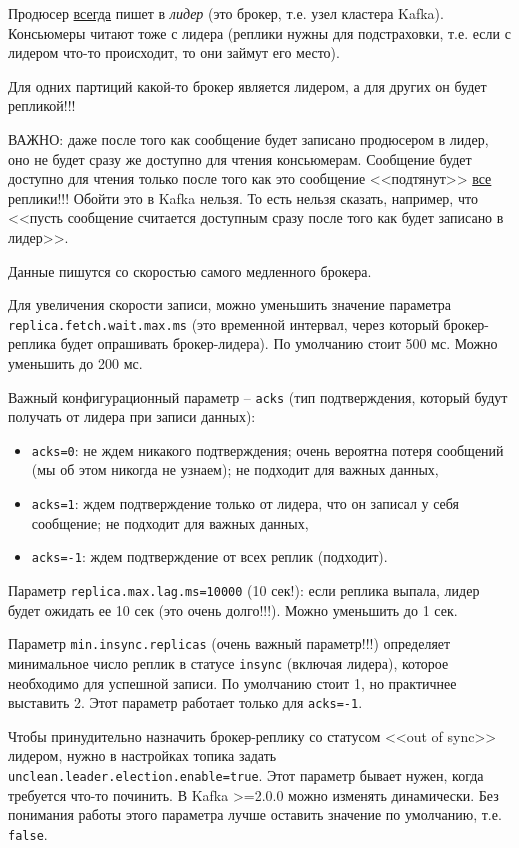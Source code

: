 \documentclass[%
	11pt,
	a4paper,
	utf8,
		]{article}
\begin{document}
Продюсер \underline{всегда} пишет в \emph{лидер} (это брокер, т.е. узел кластера Kafka). Консьюмеры читают тоже с лидера (реплики нужны для подстраховки, т.е. если с лидером что-то происходит, то они займут его место).

Для одних партиций какой-то брокер является лидером, а для других он будет репликой!!!

ВАЖНО: даже после того как сообщение будет записано продюсером в лидер, оно не будет сразу же доступно для чтения консьюмерам. Сообщение будет доступно для чтения только после того как это сообщение <<подтянут>> \underline{все} реплики!!! Обойти это в Kafka нельзя. То есть нельзя сказать, например, что <<пусть сообщение считается доступным сразу после того как будет записано в лидер>>.

Данные пишутся со скоростью самого медленного брокера.

Для увеличения скорости записи, можно уменьшить значение параметра \texttt{replica.fetch.wait.max.ms} (это временной интервал, через который брокер-реплика будет опрашивать брокер-лидера). По умолчанию стоит 500 мс. Можно уменьшить до 200 мс.

Важный конфигурационный параметр -- \texttt{acks} (тип подтверждения, который будут получать от лидера при записи данных):
\begin{itemize}
	\item \texttt{acks=0}: не ждем никакого подтверждения; очень вероятна потеря сообщений (мы об этом никогда не узнаем); не подходит для важных данных,
	
	\item \texttt{acks=1}: ждем подтверждение только от лидера, что он записал у себя сообщение; не подходит для важных данных,
	
	\item \texttt{acks=-1}: ждем подтверждение от всех реплик (подходит). 
\end{itemize}

Параметр \texttt{replica.max.lag.ms=10000} (10 сек!): если реплика выпала, лидер будет ожидать ее 10 сек (это очень долго!!!). Можно уменьшить до 1 сек.

Параметр \texttt{min.insync.replicas} (очень важный параметр!!!) определяет минимальное число реплик в статусе \texttt{insync} (включая лидера), которое необходимо для успешной записи. По умолчанию стоит 1, но практичнее выставить 2. Этот параметр работает только для \texttt{acks=-1}.

Чтобы принудительно назначить брокер-реплику со статусом <<out of sync>> лидером, нужно в настройках топика задать \texttt{unclean.leader.election.enable=true}. Этот параметр бывает нужен, когда требуется что-то починить. В Kafka >=2.0.0 можно изменять динамически. Без понимания работы этого параметра лучше оставить значение по умолчанию, т.е. \texttt{false}.
\end{document}
